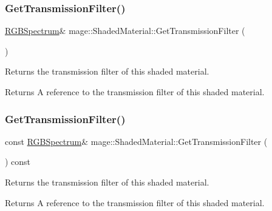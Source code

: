 \subsubsection{\texorpdfstring{Get\+Transmission\+Filter()}{GetTransmissionFilter()}\hspace{0.1cm}{\footnotesize\ttfamily [1/2]}}
{\footnotesize\ttfamily \hyperlink{structmage_1_1_r_g_b_spectrum}{R\+G\+B\+Spectrum}\& mage\+::\+Shaded\+Material\+::\+Get\+Transmission\+Filter (\begin{DoxyParamCaption}{ }\end{DoxyParamCaption})\hspace{0.3cm}{\ttfamily [noexcept]}}

Returns the transmission filter of this shaded material.

\begin{DoxyReturn}{Returns}
A reference to the transmission filter of this shaded material. 
\end{DoxyReturn}
\hypertarget{structmage_1_1_shaded_material_ac1735260a6d52bacbaea76594f7fbfdb}{}\label{structmage_1_1_shaded_material_ac1735260a6d52bacbaea76594f7fbfdb} 
\subsubsection{\texorpdfstring{Get\+Transmission\+Filter()}{GetTransmissionFilter()}\hspace{0.1cm}{\footnotesize\ttfamily [2/2]}}
{\footnotesize\ttfamily const \hyperlink{structmage_1_1_r_g_b_spectrum}{R\+G\+B\+Spectrum}\& mage\+::\+Shaded\+Material\+::\+Get\+Transmission\+Filter (\begin{DoxyParamCaption}{ }\end{DoxyParamCaption}) const\hspace{0.3cm}{\ttfamily [noexcept]}}

Returns the transmission filter of this shaded material.

\begin{DoxyReturn}{Returns}
A reference to the transmission filter of this shaded material. 
\end{DoxyReturn}
\hypertarget{structmage_1_1_shaded_material_aa5bf63809d61d57587e2e3fd09dad45d}{}\label{structmage_1_1_shaded_material_aa5bf63809d61d57587e2e3fd09dad45d} 
